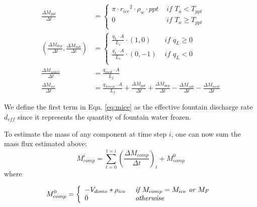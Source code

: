 \documentclass[utf8]{frontiersSCNS} %
\begin{document}
\begin{subequations}
\label{equations}
\begin{align}
    \label{eq:ppt} 
    \frac{\Delta M_{ppt}}{\Delta t}  &= \left\{ \begin{array}{ll} \pi \cdot {r_{ice}}^2 \cdot
\rho_{w}\cdot ppt& \textit{ if } T_{a} < T_{ppt} \\ 0 & \textit{ if } T_{a} \geq T_{ppt} \\ \end{array} \right. \\
    \label{eq:vap} 
            (\frac{\Delta M_{dep}}{\Delta t}, \frac{\Delta M_{sub}}{\Delta t}) &= \left\{ \begin{array}{ll} \frac{q_{L}
                        \cdot A}{L_s}\cdot (1,0)& \textit{ if } q_{L} \geq 0 \\ \frac{q_{L}
            \cdot A}{L_s}\cdot (0,-1) & \textit{ if } q_{L} < 0 \\ \end{array} \right. \\
    \label{eq:mwat} 
            \frac{\Delta M_{water}}{\Delta t} &= \frac{q_{melt} \cdot A }{L_f}\\
    \label{eq:mice} 
    \frac{\Delta M_{ice}}{\Delta t} &= \frac{q_{freeze}\cdot A }{L_f} + \frac{\Delta M_{ppt}}{\Delta t} + \frac{\Delta
    M_{dep}}{\Delta t}- \frac{\Delta M_{sub}}{\Delta t}- \frac{\Delta M_{melt}}{\Delta t}
\end{align}
\end{subequations}

We define the first term in Eqn. \ref{eq:mice} as the effective fountain discharge rate $d_{eff}$ since it represents
the quantity of fountain water frozen.

To estimate the mass of any component at time step $i$, one can now sum the mass flux estimated above:
\begin{equation} M_{comp}^i = \sum_{t=0}^{t=i} (\frac{\Delta M_{comp}}{\Delta t})_{t} + M_{comp}^0 \end{equation}
where 

\begin{equation} M_{comp}^0 = \left\{ \begin{array}{ll} -V_{dome} * \rho_{ice} & \textit{ if } M_{comp}=
        M_{ice}\textit{ or }
M_{F}\\ 0 & \textit{ otherwise }\\ \end{array} \right. \\
 \end{equation}
\end{document}
